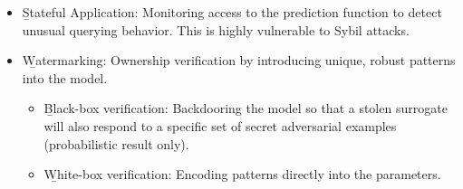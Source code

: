 \begin{itemize}
\item \b{Stateful Application}: Monitoring access to the prediction function to detect unusual querying behavior. This is highly vulnerable to Sybil attacks.
\item \b{Watermarking}: Ownership verification by introducing unique, robust patterns into the model.
\begin{itemize}
    \item \b{Black-box verification:} Backdooring the model so that a stolen surrogate will also respond to a specific set of secret adversarial examples (probabilistic result only).
    \item \b{White-box verification:} Encoding patterns directly into the parameters.
\end{itemize}
\end{itemize}





